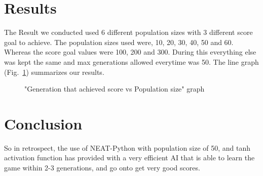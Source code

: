 \documentclass[conference]{IEEEtran}
\begin{document}
\section{Results}

The Result we conducted used 6 different population sizes with 3 different score goal to achieve. The population sizes used were, 10, 20, 30, 40, 50 and 60. Whereas the score goal values were 100, 200 and 300. During this everything else was kept the same and max generations allowed everytime was 50. The line graph (Fig.~\ref{fig7}) summarizes our results.

\begin{figure}[htbp]
\caption{"Generation that achieved score vs Population size" graph}
\label{fig7}
\end{figure}

\section{Conclusion}

So in retrospect, the use of NEAT-Python with population size of 50, and tanh activation function has provided with a very efficient AI that is able to learn the game within 2-3 generations, and go onto get very good scores.
\end{document}
